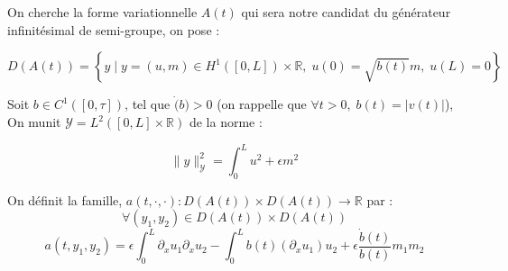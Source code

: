 \documentclass[a4paper]{article}
\newcommand{\dep}{b}
\newcommand{\Y}{\mathscr{Y}}
\begin{document}
On cherche la forme variationnelle $A(t)$ qui sera notre candidat
du générateur infinitésimal de semi-groupe, on pose : 

\[D(A(t)) = \left\{ y \; | \; y = (u,m) \in H^1([0,L])\times \mathbb{R},
 \; u(0)=\sqrt{\dep (t)} m, \; u(L)=0 \right\} \]
 
 
 
  
 \begin{proposition}
  	Soit $b \in C^1([0,\tau])$, tel que $\dot(b)>0$
	(on rappelle que $\forall t>0, \;  \dep (t) = |v(t)|$), 
	On munit $\Y = L^2([0,L]\times \mathbb{R})$ de la norme :
  
    \[\| y\|_{\mathscr{Y}}^2 = \int_0^L u^2 + \epsilon m^2 \]
	
   	On définit la famille,
  	$a(t,\cdot, \cdot): D(A(t)) \times D(A(t)) \to \mathbb{R}$ par :
   	\[
   	\forall (y_1,y_2) \in D(A(t)) \times D(A(t))
  	\]
  	\begin{equation}
  		\label{def:a3}
  		 a(t,y_1,y_2) =   \epsilon \int_0^L \partial_xu_1 \partial_xu_2
  		                 - \int_0^L \dep (t) (\partial_xu_1)u_2
                          +\epsilon \displaystyle \frac{\dot{\dep}(t)}{\dep(t)}m_1m_2
  	\end{equation}
  \end{proposition}
\end{document}
